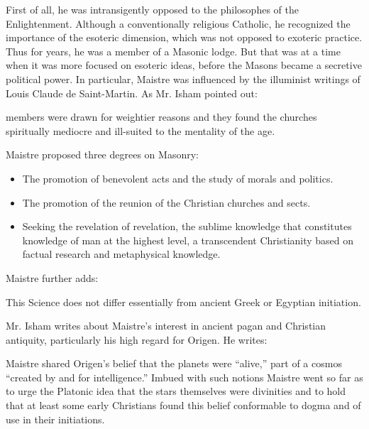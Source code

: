 First of all, he was intransigently opposed to the philosophes of the Enlightenment. Although a conventionally religious Catholic, he recognized the importance of the esoteric dimension, which was not opposed to exoteric practice. Thus for years, he was a member of a Masonic lodge. But that was at a time when it was more focused on esoteric ideas, before the Masons became a secretive political power. In particular, Maistre was influenced by the illuminist writings of Louis Claude de Saint-Martin. As Mr. Isham pointed out:

\begin{quotex}
members were drawn for weightier reasons and they found the churches spiritually mediocre and ill-suited to the mentality of the age.
\end{quotex}


Maistre proposed three degrees on Masonry:

\begin{itemize}


\item The promotion of benevolent acts and the study of morals and politics.

\item The promotion of the reunion of the Christian churches and sects.

\item Seeking the revelation of revelation, the sublime knowledge that constitutes knowledge of man at the highest level, a transcendent Christianity based on factual research and metaphysical knowledge.
\end{itemize}


Maistre further adds:

\begin{quotex}
This Science does not differ essentially from ancient Greek or Egyptian initiation.
\end{quotex}


Mr. Isham writes about Maistre's interest in ancient pagan and Christian antiquity, particularly his high regard for Origen. He writes:

\begin{quotex}
Maistre shared Origen's belief that the planets were ``alive,'' part of a cosmos ``created by and for intelligence.'' Imbued with such notions Maistre went so far as to urge the Platonic idea that the stars themselves were divinities and to hold that at least some early Christians found this belief conformable to dogma and of use in their initiations.
\end{quotex}


